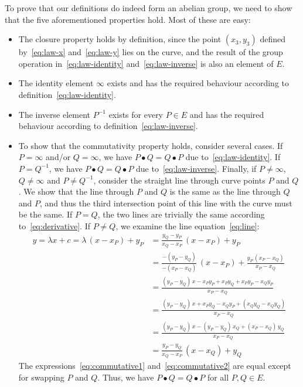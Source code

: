 \documentclass{article}
\begin{document}
To prove that our definitions do indeed form an abelian group, we need to show that the five aforementioned properties hold.
Most of these are easy:
\begin{itemize}
\item The closure property holds by definition, since the point $(x_3, y_3)$ defined by~\eqref{eq:law-x} and~\eqref{eq:law-y} lies on the curve, and the result of the group operation in~\eqref{eq:law-identity} and~\eqref{eq:law-inverse} is also an element of $E$.
\item The identity element $\infty$ exists and has the required behaviour according to definition~\eqref{eq:law-identity}.
\item The inverse element $P^{-1}$ exists for every $P \in E$ and has the required behaviour according to definition~\eqref{eq:law-inverse}.
\item To show that the commutativity property holds, consider several cases.
If $P = \infty$ and/or $Q = \infty$, we have $P \bullet Q = Q \bullet P$ due to~\eqref{eq:law-identity}.
If $P = Q^{-1}$, we have $P \bullet Q = Q \bullet P$ due to~\eqref{eq:law-inverse}.
Finally, if $P \neq \infty$, $Q \neq \infty$ and $P \neq Q^{-1}$, consider the straight line through curve points $P$ and $Q$.
We show that the line through $P$ and $Q$ is the same as the line through $Q$ and $P$, and thus the third intersection point of this line with the curve must be the same.
If $P=Q$, the two lines are trivially the same according to~\eqref{eq:derivative}.
If $P \neq Q$, we examine the line equation~\eqref{eq:line}:
\begin{align}
y = \lambda x + c = \lambda\,(x - x_P) + y_P &= \frac{y_Q - y_P}{x_Q - x_P}\,(x - x_P) + y_P \label{eq:commutative1}\\[5pt]
& = \frac{-(y_P - y_Q)}{-(x_P - x_Q)}\,(x - x_P) + \frac{y_P\,(x_P - x_Q)}{x_P - x_Q} \nonumber\\[5pt]
& = \frac{(y_P - y_Q)\,x - x_P y_P + x_P y_Q + x_P y_P - x_Q y_P}{x_P - x_Q} \nonumber\\[5pt]
& = \frac{(y_P - y_Q)\,x + x_P y_Q - x_Q y_P + (x_Q y_Q - x_Q y_Q)}{x_P - x_Q} \nonumber\\[5pt]
& = \frac{(y_P - y_Q)\,x - (y_P - y_Q)\,x_Q + (x_P - x_Q)\,y_Q}{x_P - x_Q} \nonumber\\[5pt]
& = \frac{y_P - y_Q}{x_Q - x_P}\,(x - x_Q) + y_Q \label{eq:commutative2}
\end{align}
The expressions~\eqref{eq:commutative1} and~\eqref{eq:commutative2} are equal except for swapping $P$ and $Q$.
Thus, we have $P \bullet Q = Q \bullet P$ for all $P, Q \in E$.
\end{itemize}
\end{document}
